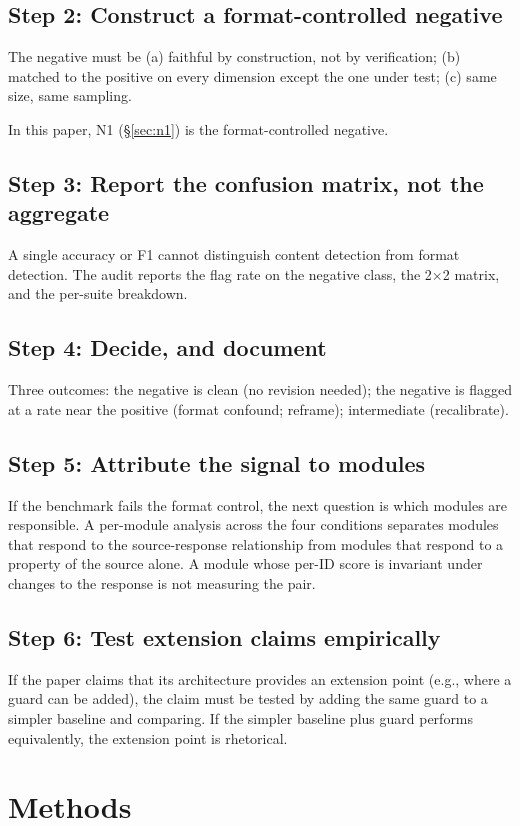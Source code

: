 \documentclass[11pt,a4paper]{article}
\begin{document}
\subsection{Step 2: Construct a format-controlled negative}
The negative must be (a) faithful by construction, not by verification; (b) matched to the positive on every dimension except the one under test; (c) same size, same sampling.

In this paper, N1 (\S\ref{sec:n1}) is the format-controlled negative.

\subsection{Step 3: Report the confusion matrix, not the aggregate}
A single accuracy or F1 cannot distinguish content detection from format detection. The audit reports the flag rate on the negative class, the 2$\times$2 matrix, and the per-suite breakdown.

\subsection{Step 4: Decide, and document}
Three outcomes: the negative is clean (no revision needed); the negative is flagged at a rate near the positive (format confound; reframe); intermediate (recalibrate).

\subsection{Step 5: Attribute the signal to modules}
If the benchmark fails the format control, the next question is which modules are responsible. A per-module analysis across the four conditions separates modules that respond to the source-response relationship from modules that respond to a property of the source alone. A module whose per-ID score is invariant under changes to the response is not measuring the pair.

\subsection{Step 6: Test extension claims empirically}
If the paper claims that its architecture provides an extension point (e.g., where a guard can be added), the claim must be tested by adding the same guard to a simpler baseline and comparing. If the simpler baseline plus guard performs equivalently, the extension point is rhetorical.

\section{Methods}
\end{document}
